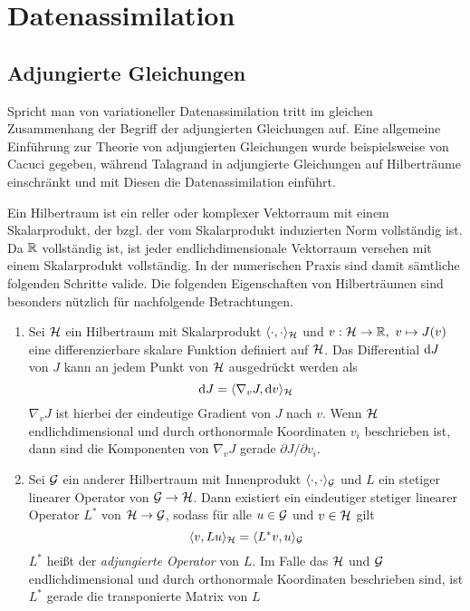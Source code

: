 \chapter{Datenassimilation}
\section{Adjungierte Gleichungen}
Spricht man von variationeller Datenassimilation tritt im gleichen Zusammenhang der Begriff der adjungierten Gleichungen auf. Eine allgemeine Einführung zur Theorie von adjungierten Gleichungen wurde beispielsweise von Cacuci \cite{cacuci1981sensitivity} gegeben, während Talagrand in \cite{talagrand1987variational} adjungierte Gleichungen auf Hilberträume einschränkt und mit Diesen die Datenassimilation einführt.

Ein Hilbertraum ist ein reller oder komplexer Vektorraum mit einem Skalarprodukt, der bzgl. der vom Skalarprodukt induzierten Norm vollständig ist. Da $\mathbb{R}$ vollständig ist, ist jeder endlichdimensionale Vektorraum versehen mit einem Skalarprodukt vollständig. In der numerischen Praxis sind damit sämtliche folgenden Schritte valide. Die folgenden Eigenschaften von Hilberträumen sind besonders nützlich für nachfolgende Betrachtungen.
\begin{proposition}
\label{prop:adjoints}
\begin{enumerate}
 \item Sei $\mathcal{H}$ ein Hilbertraum mit Skalarprodukt $\langle \cdot,\cdot \rangle_{\mathcal{H}}$ und $v:\mathcal{H} \to \mathbb{R},~ v\mapsto J(v)$ eine differenzierbare skalare Funktion definiert auf $\mathcal{H}$. Das Differential $\text{d} J$ von $J$ kann an jedem Punkt von $\mathcal{H}$ ausgedrückt werden als
 \begin{equation}
 \label{eq:diffInnerProduct}
  \text{d} J = \langle \nabla_v J, \text{d} v\rangle_{\mathcal{H}}
 \end{equation}
 $\nabla_v J$ ist hierbei der eindeutige Gradient von $J$ nach $v$. Wenn $\mathcal{H}$ endlichdimensional und durch orthonormale Koordinaten $v_i$ beschrieben ist, dann sind die Komponenten von $\nabla_v J$ gerade $\partial J/\partial v_i$.
\item Sei $\mathcal{G}$ ein anderer Hilbertraum mit Innenprodukt $\langle \cdot,\cdot \rangle_{\mathcal{G}}$ und $L$ ein stetiger linearer Operator von $\mathcal{G}\to \mathcal{H}$. Dann existiert ein eindeutiger stetiger linearer Operator $L^*$ von $\mathcal{H}\to\mathcal{G}$, sodass für alle $u\in \mathcal{G}$ und $v\in \mathcal{H}$ gilt
\begin{equation}
\label{eq:adjointInnerProduct}
\langle v,Lu\rangle_{\mathcal{H}} =  \langle L^*v,u \rangle_{\mathcal{G}}
\end{equation}
$L^*$ heißt der \textit{adjungierte Operator} von $L$. Im Falle das $\mathcal{H}$ und $\mathcal{G}$ endlichdimensional und durch orthonormale Koordinaten beschrieben sind, ist $L^*$ gerade die transponierte Matrix von $L$
\end{enumerate} 
\end{proposition}

